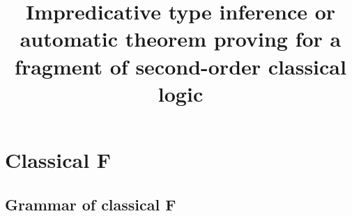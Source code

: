 \documentclass{amsart}
\title
[Impredicative type inference]
{
Impredicative type inference
\break
or
\break
automatic theorem proving \break
for a fragment of \break
second-order classical logic
}
\begin{document}
\newcommand{\nc}{\newcommand}
\newcommand{\DotExpr}[2]{#1 #2.\ }
\nc\Abs   {\DotExpr\lambda}
\nc\All   {\DotExpr\forall}
\nc\Bro   {\operatorname{Brouwer}}
\nc\CallCC{\operatorname{call/cc}}
\nc\Case  {}
\nc\Cps   {\operatorname{cps}}
\nc\Dn [1]{(#1 \R \bot) \R \bot}
\nc\Dni   {\mathrm{\neg\neg I}}
\nc\Ex    {\DotExpr\exists}
\nc\FV    {\operatorname{FV}}
\nc\Indent{\hspace{3em}}
\nc\Mgs   {\operatorname{mgs}}
\nc\Or    {\ | \ }
\nc\Prune {\operatorname{prune}}
\nc\Recall{\DotExpr\Xi} %
\nc\Redo  {\operatorname{redo}}
\nc\Tabs  {\DotExpr\Lambda}
\nc\R     {\rightarrow}
\nc\Undo  {\operatorname{undo}}
\nc\Unify {\operatorname{unify}}
\maketitle
\tableofcontents

\section{Classical F}

\subsection{Grammar of classical F}

\nc\Ftype{
\tau & ::= & \alpha & \mbox{type variable} \\
&\Or& \tau \rightarrow \tau & \mbox{function type} \\
&\Or& \All\alpha\tau & \mbox{universal type} \\
}

\nc\CFtype{
\Ftype
&\Or& \Ex\alpha\tau & \mbox{existential type} \\
}

\nc\CFterm{
t & ::= & x & \mbox{variables} \\
&\Or& \Abs{x:\tau}t  & \mbox{lambda abstraction} \\
&\Or& \ t~t & \mbox{function application} \\
}

\nc\SelectiveTypeAmnesia{
&\Or& t~\{\Ex\alpha\tau\} & \mbox{selective type amnesia} \\
}

\nc\TypingContexts{
\Gamma & ::= & \Gamma, x : \tau & \mbox{term variable binding}\\
&\Or& \Gamma, \alpha& \mbox{type variable binding} \\
&\Or& \epsilon & \mbox{empty context}\\ \\
}
\end{document}
